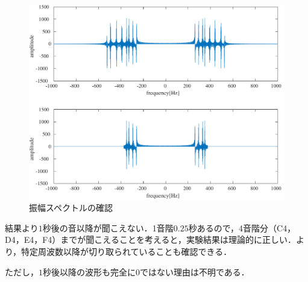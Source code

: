 \begin{figure}[h]
    \begin{minipage}[b]{.3\textwidth}
        \centering
        \includegraphics[keepaspectratio,width=\textwidth]{../../Figures/02_21.pdf}
        \caption{振幅スペクトルの確認}
        \label{fig:振幅スペクトルの確認}
    \end{minipage}
\end{figure}
\consideration
結果より\(1\)秒後の音以降が聞こえない．1音階\(0.25\)秒あるので，4音階分（C4，D4，E4，F4）までが聞こえることを考えると，実験結果は理論的に正しい．より，特定周波数以降が切り取られていることも確認できる．\par
ただし，\(1\)秒後以降の波形も完全に0ではない理由は不明である．
